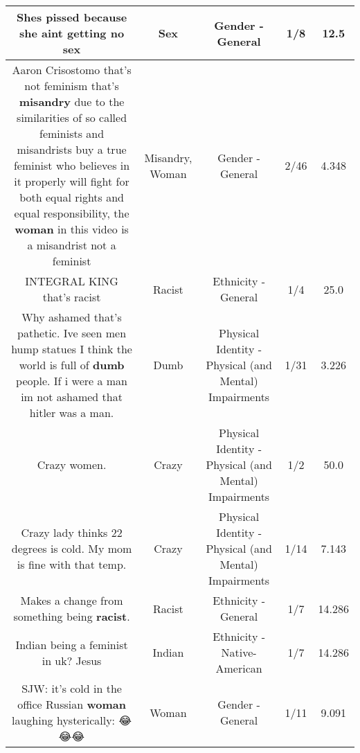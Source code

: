 \documentclass[11pt]{article}
\newlength\mylength
\begin{document}
\begin{center}
\begin{longtable}{|C{.65\mylength}|C{.30\mylength}|C{.12\mylength}|C{.12\mylength}|C{.12\mylength}|}
  \small Shes pissed because she aint getting no sex\normalsize   & Sex & Gender - General & 1/8 & 12.5 \\  \hline
  \small Aaron Crisostomo that's not feminism that's \textbf{misandry} due to the similarities of so called feminists and misandrists buy a true feminist who believes in it properly will fight for both equal rights and equal responsibility, the \textbf{woman} in this video is a misandrist not a feminist\normalsize   & Misandry, Woman & Gender - General & 2/46 & 4.348 \\  \hline
  \small INTEGRAL KING that's racist\normalsize   & Racist & Ethnicity - General & 1/4 & 25.0 \\  \hline
  \small Why ashamed that's pathetic. Ive seen men hump statues I think the world is full of \textbf{dumb} people. If i were a man im not ashamed that hitler was a man.\normalsize   & Dumb & Physical Identity - Physical (and Mental) Impairments & 1/31 & 3.226 \\  \hline
  \small Crazy women.\normalsize   & Crazy & Physical Identity - Physical (and Mental) Impairments & 1/2 & 50.0 \\  \hline
  \small Crazy lady thinks 22 degrees is cold. My mom is fine with that temp.\normalsize   & Crazy & Physical Identity - Physical (and Mental) Impairments & 1/14 & 7.143 \\  \hline
  \small Makes a change from something being \textbf{racist}.\normalsize   & Racist & Ethnicity - General & 1/7 & 14.286 \\  \hline
  \small Indian being a feminist in uk? Jesus\normalsize   & Indian & Ethnicity - Native-American & 1/7 & 14.286 \\  \hline
  \small SJW: it's cold in the office Russian \textbf{woman} laughing hysterically: 😂😂😂\normalsize   & Woman & Gender - General & 1/11 & 9.091 \\  \hline

\end{longtable}
\end{center}
\end{document}

